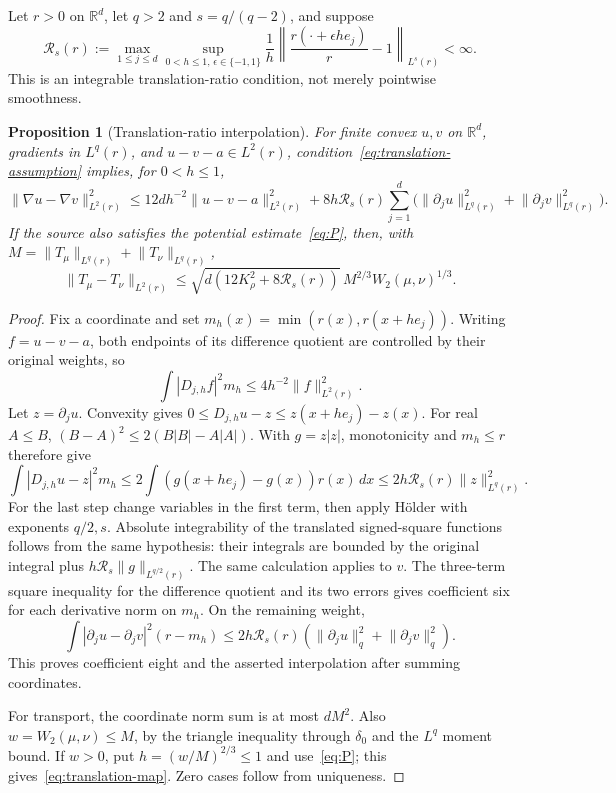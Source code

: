 \documentclass[11pt]{article}
\newtheorem{proposition}[theorem]{Proposition}
\theoremstyle{remark}\newtheorem{remark}[theorem]{Remark}
\newcommand{\R}{\mathbb R}\newcommand{\Var}{\operatorname{Var}}
\newcommand{\norm}[1]{\lVert#1\rVert}\newcommand{\ind}{\mathbf 1}
\begin{document}
Let $r>0$ on $\R^d$, let $q>2$ and $s=q/(q-2)$, and suppose
\begin{equation}\label{eq:translation-assumption}
 \mathcal R_s(r):=\max_{1\le j\le d}\sup_{0<h\le1,\,\epsilon\in\{-1,1\}}
 \frac1h\left\|\frac{r(\cdot+\epsilon he_j)}r-1\right\|_{L^s(r)}<\infty.
\end{equation}
This is an integrable translation-ratio condition, not merely pointwise smoothness.

\begin{proposition}[Translation-ratio interpolation]\label{prop:translation}
For finite convex $u,v$ on $\R^d$, gradients in $L^q(r)$, and $u-v-a\in L^2(r)$, condition~\eqref{eq:translation-assumption} implies, for $0<h\le1$,
\[
 \norm{\nabla u-\nabla v}_{L^2(r)}^2
 \le12d h^{-2}\norm{u-v-a}_{L^2(r)}^2
 +8h\mathcal R_s(r)\sum_{j=1}^d
 \bigl(\norm{\partial_j u}_{L^q(r)}^2+
       \norm{\partial_j v}_{L^q(r)}^2\bigr).
\]
If the source also satisfies the potential estimate~\eqref{eq:P}, then, with
$M=\norm{T_\mu}_{L^q(r)}+\norm{T_\nu}_{L^q(r)}$,
\begin{equation}\label{eq:translation-map}
 \norm{T_\mu-T_\nu}_{L^2(r)}
 \le\sqrt{d(12K_\rho^2+8\mathcal R_s(r))}\,
             M^{2/3}W_2(\mu,\nu)^{1/3}.
\end{equation}
\end{proposition}
\begin{proof}
Fix a coordinate and set $m_h(x)=\min(r(x),r(x+he_j))$.
Writing $f=u-v-a$, both endpoints of its difference quotient are controlled by their original weights, so
\[
 \int|D_{j,h}f|^2m_h\le4h^{-2}\norm f_{L^2(r)}^2.
\]
Let $z=\partial_j u$. Convexity gives
$0\le D_{j,h}u-z\le z(x+he_j)-z(x)$.
For real $A\le B$,
$(B-A)^2\le2(B|B|-A|A|)$.
With $g=z|z|$, monotonicity and $m_h\le r$ therefore give
\[
 \int|D_{j,h}u-z|^2m_h
 \le2\int(g(x+he_j)-g(x))r(x)\,dx
 \le2h\mathcal R_s(r)\norm z_{L^q(r)}^2.
\]
For the last step change variables in the first term, then apply H\"older with exponents $q/2,s$. Absolute integrability of the translated signed-square functions follows from the same hypothesis: their integrals are bounded by the original integral plus
$h\mathcal R_s\norm g_{L^{q/2}(r)}$.
The same calculation applies to $v$. The three-term square inequality for the difference quotient and its two errors gives coefficient six for each derivative norm on $m_h$. On the remaining weight,
\[
 \int|\partial_j u-\partial_j v|^2(r-m_h)
 \le2h\mathcal R_s(r)
       (\norm{\partial_j u}_q^2+\norm{\partial_j v}_q^2).
\]
This proves coefficient eight and the asserted interpolation after summing coordinates.

For transport, the coordinate norm sum is at most $dM^2$. Also $w=W_2(\mu,\nu)\le M$, by the triangle inequality through $\delta_0$ and the $L^q$ moment bound. If $w>0$, put $h=(w/M)^{2/3}\le1$ and use~\eqref{eq:P}; this gives~\eqref{eq:translation-map}. Zero cases follow from uniqueness.
\end{proof}
\end{document}
